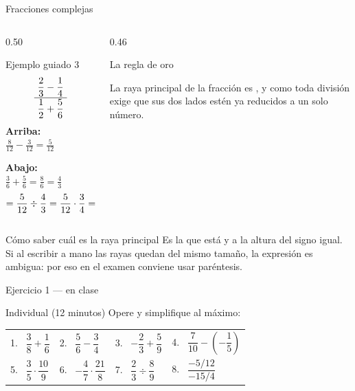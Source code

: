 \documentclass[aspectratio=169,10pt]{beamer}
\begin{document}
\begin{frame}{Fracciones complejas}
  \scriptsize
  \begin{columns}[T,onlytextwidth]
    \begin{column}{0.50\textwidth}
      \begin{block}{Ejemplo guiado 3}
        \tiny
        \[ \cfrac{\ \dfrac{2}{3} - \dfrac{1}{4}\ }
                 {\ \dfrac{1}{2} + \dfrac{5}{6}\ } \]
        \textbf{Arriba:} \ $\tfrac{8}{12}-\tfrac{3}{12} = \tfrac{5}{12}$

        \textbf{Abajo:} \ $\tfrac{3}{6}+\tfrac{5}{6} = \tfrac{8}{6}
        = \tfrac{4}{3}$
        \[ = \frac{5}{12}\div\frac{4}{3}
           = \frac{5}{12}\cdot\frac{3}{4} = \frac{15}{48}
           = \destacar{\frac{5}{16}} \]
      \end{block}
    \end{column}
    \begin{column}{0.46\textwidth}
      \begin{alertblock}{La regla de oro}
        \tiny

        \vspace{0.1cm}
        La raya principal de la fracción es , y como toda
        división exige que sus dos lados estén ya reducidos a un solo número.
      \end{alertblock}
    \end{column}
  \end{columns}

  \vspace{0.08cm}
  \begin{exampleblock}{Cómo saber cuál es la raya principal}
    \tiny
    Es la que está  y a la altura del signo igual. Si al
    escribir a mano las rayas quedan del mismo tamaño, la expresión es
    ambigua: por eso en el examen conviene usar paréntesis.
  \end{exampleblock}
\end{frame}

\begin{frame}{Ejercicio 1 — en clase}
  \begin{alertblock}{Individual (12 minutos)}
    \scriptsize
    Opere y simplifique al máximo:

    \vspace{0.25cm}
    \centering
    \begin{tabular}{@{}llll@{}}
      1. \ $\dfrac{3}{8} + \dfrac{1}{6}$ &
      2. \ $\dfrac{5}{6} - \dfrac{3}{4}$ &
      3. \ $-\dfrac{2}{3} + \dfrac{5}{9}$ &
      4. \ $\dfrac{7}{10} - \left(-\dfrac{1}{5}\right)$ \\[1.1em]
      5. \ $\dfrac{3}{5}\cdot\dfrac{10}{9}$ &
      6. \ $-\dfrac{4}{7}\cdot\dfrac{21}{8}$ &
      7. \ $\dfrac{2}{3} \div \dfrac{8}{9}$ &
      8. \ $\dfrac{-5/12}{-15/4}$ \\
    \end{tabular}
  \end{alertblock}
\end{frame}
\end{document}
